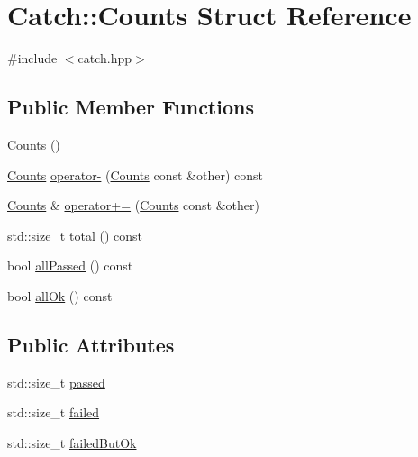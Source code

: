 \hypertarget{structCatch_1_1Counts}{\section{Catch\-:\-:Counts Struct Reference}
\label{structCatch_1_1Counts}
}


{\ttfamily \#include $<$catch.\-hpp$>$}

\subsection*{Public Member Functions}
\begin{DoxyCompactItemize}
\item 
\hyperlink{structCatch_1_1Counts_aab9092ce70d4b0179cc743555d2fc39b}{Counts} ()
\item 
\hyperlink{structCatch_1_1Counts}{Counts} \hyperlink{structCatch_1_1Counts_aedf86fefe33938d132a6981171cd83e6}{operator-\/} (\hyperlink{structCatch_1_1Counts}{Counts} const \&other) const 
\item 
\hyperlink{structCatch_1_1Counts}{Counts} \& \hyperlink{structCatch_1_1Counts_a322a89475cd2cc039140ef371e973677}{operator+=} (\hyperlink{structCatch_1_1Counts}{Counts} const \&other)
\item 
std\-::size\-\_\-t \hyperlink{structCatch_1_1Counts_a9125c662e30114e5c5cc94729b1e9e84}{total} () const 
\item 
bool \hyperlink{structCatch_1_1Counts_adbbaca552f6017ce69e0d5dc5500bea4}{all\-Passed} () const 
\item 
bool \hyperlink{structCatch_1_1Counts_ab2497c9dfc77be757a90225ea69595f5}{all\-Ok} () const 
\end{DoxyCompactItemize}
\subsection*{Public Attributes}
\begin{DoxyCompactItemize}
\item 
std\-::size\-\_\-t \hyperlink{structCatch_1_1Counts_ad28daaf3de28006400208b6dd0c631e6}{passed}
\item 
std\-::size\-\_\-t \hyperlink{structCatch_1_1Counts_a19982a3817a3bc2c07f0290e71f497a3}{failed}
\item 
std\-::size\-\_\-t \hyperlink{structCatch_1_1Counts_ac090973a2ff51394cd452718e75c073e}{failed\-But\-Ok}
\end{DoxyCompactItemize}


